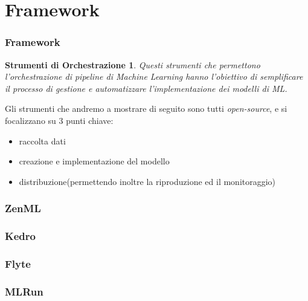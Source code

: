 \documentclass[xcolor=dvipsnames]{beamer}
\begin{document}
\section{Framework}

\begin{frame}    
        \frametitle{Framework}
        \newtheorem{fw}{Strumenti di Orchestrazione}

        \begin{fw}
            Questi strumenti che permettono l'orchestrazione di pipeline di Machine Learning  hanno l'obiettivo di semplificare il processo di gestione e automatizzare l'implementazione dei modelli di ML.
        \end{fw}
        Gli strumenti che andremo a mostrare di seguito sono tutti \textit{open-source}, e si focalizzano su 3 punti chiave:
        \begin{itemize}
            \item raccolta dati
            \item creazione e implementazione del modello
            \item distribuzione(permettendo inoltre la riproduzione ed il monitoraggio)
        \end{itemize}
\end{frame}
\begin{frame}
    \frametitle{ZenML}

    

\end{frame}

\begin{frame}
    \frametitle{Kedro}

    

\end{frame}

\begin{frame}
    \frametitle{Flyte}

    

\end{frame}

\begin{frame}
    \frametitle{MLRun}

    

\end{frame}
\end{document}
